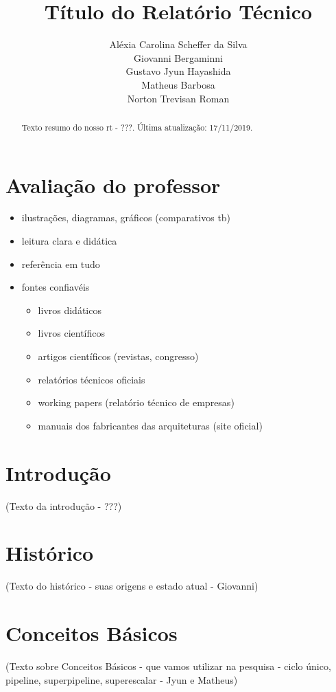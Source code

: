 \documentclass[12pt,a4paper,brazilian,utf8]{ppgsi}
\title{Título do Relatório Técnico}
\author{Aléxia Carolina Scheffer da Silva\inst{1}\\ Giovanni Bergaminni\inst{1}\\ Gustavo Jyun Hayashida\inst{1}\\ Matheus Barbosa\inst{1}\\ Norton Trevisan Roman\inst{1}}
\begin{document}
\maketitle

\begin{abstract}
    Texto  resumo do nosso rt - ???. Última atualização: 17/11/2019.
\end{abstract}

\section{Avaliação do professor}
    \begin{itemize}
		\item ilustrações, diagramas, gráficos (comparativos tb)
        \item leitura clara e didática
		\item referência em tudo
        \item fontes confiavéis
            \begin{itemize}
        		\item livros didáticos
                \item livros científicos
                \item artigos científicos (revistas, congresso)
                \item relatórios técnicos oficiais
                \item working papers (relatório técnico de empresas)
                \item manuais dos fabricantes das arquiteturas (site oficial)
        	\end{itemize}
	\end{itemize}

\section{Introdução}
    (Texto da introdução - ???)
    \cite{Bourdieu1977}

\section{Histórico}
    (Texto do histórico - suas origens  e estado atual - Giovanni)

\section{Conceitos Básicos}
    (Texto sobre Conceitos Básicos - que vamos utilizar na pesquisa - ciclo único, pipeline, superpipeline, superescalar - Jyun e Matheus)
    
\end{document}
